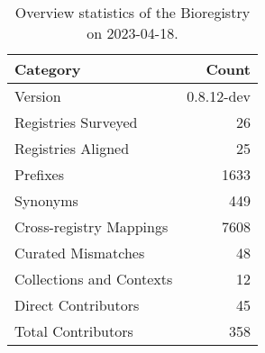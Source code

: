 \begin{table}
\caption{Overview statistics of the Bioregistry on 2023-04-18.}
\label{tab:bioregistry-summary}
\begin{tabular}{lr}
\toprule
Category & Count \\
\midrule
Version & 0.8.12-dev \\
Registries Surveyed & 26 \\
Registries Aligned & 25 \\
Prefixes & 1633 \\
Synonyms & 449 \\
Cross-registry Mappings & 7608 \\
Curated Mismatches & 48 \\
Collections and Contexts & 12 \\
Direct Contributors & 45 \\
Total Contributors & 358 \\
\bottomrule
\end{tabular}
\end{table}
